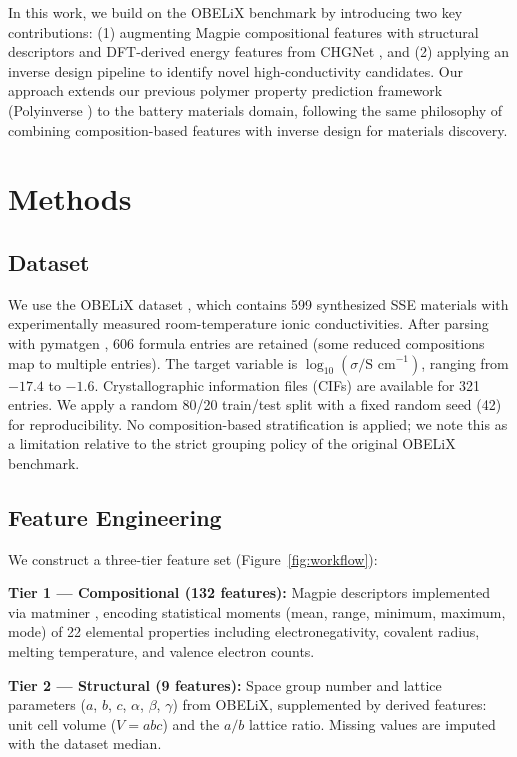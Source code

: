 \documentclass[12pt]{article}
\begin{document}
In this work, we build on the OBELiX benchmark by introducing two key contributions:
(1) augmenting Magpie compositional features with structural descriptors and
DFT-derived energy features from CHGNet \cite{deng2023chgnet}, and (2) applying an
inverse design pipeline to identify novel high-conductivity candidates. Our approach
extends our previous polymer property prediction framework (Polyinverse
\cite{im2025polyinverse}) to the battery materials domain, following the same philosophy
of combining composition-based features with inverse design for materials discovery.

\section{Methods}

\subsection{Dataset}

We use the OBELiX dataset \cite{therrien2025obelix}, which contains 599 synthesized
SSE materials with experimentally measured room-temperature ionic conductivities.
After parsing with pymatgen \cite{ong2013pymatgen}, 606 formula entries are retained
(some reduced compositions map to multiple entries). The target variable is
$\log_{10}(\sigma / \text{S cm}^{-1})$, ranging from $-17.4$ to $-1.6$.
Crystallographic information files (CIFs) are available for 321 entries. We apply a
random 80/20 train/test split with a fixed random seed (42) for reproducibility.
No composition-based stratification is applied; we note this as a limitation relative
to the strict grouping policy of the original OBELiX benchmark.

\subsection{Feature Engineering}

We construct a three-tier feature set (Figure~\ref{fig:workflow}):

\textbf{Tier 1 --- Compositional (132 features):} Magpie descriptors
\cite{ward2016magpie} implemented via matminer \cite{ward2018matminer}, encoding
statistical moments (mean, range, minimum, maximum, mode) of 22 elemental properties
including electronegativity, covalent radius, melting temperature, and valence electron
counts.

\textbf{Tier 2 --- Structural (9 features):} Space group number and lattice parameters
($a$, $b$, $c$, $\alpha$, $\beta$, $\gamma$) from OBELiX, supplemented by derived
features: unit cell volume ($V = abc$) and the $a/b$ lattice ratio. Missing values
are imputed with the dataset median.
\end{document}
